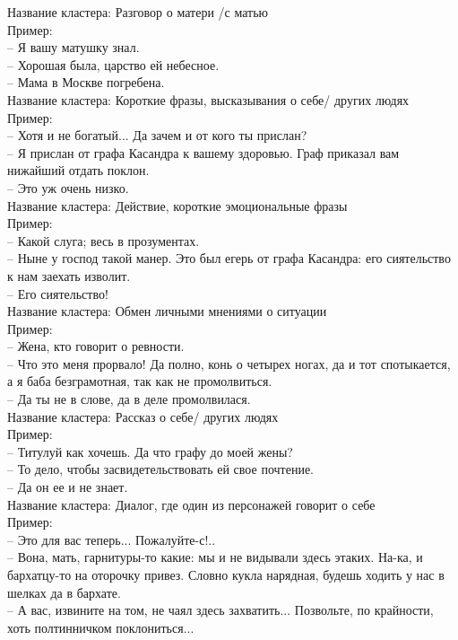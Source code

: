 \documentclass[a4paper,14pt]{article}
\begin{document}
Название кластера: Разговор о матери /с матью\\
Пример: \\
-- Я вашу матушку знал. \\
-- Хорошая была, царство ей небесное. \\
-- Мама в Москве погребена. \\



Название кластера: Короткие фразы, высказывания о себе/ других людях\\
Пример: \\
-- Хотя и не богатый... Да зачем и от кого ты прислан? \\
-- Я прислан от графа Касандра к вашему здоровью. Граф приказал вам нижайший отдать
              поклон. \\
-- Это уж очень низко. \\



Название кластера: Действие, короткие эмоциональные фразы\\
Пример: \\
-- Какой слуга; весь в прозументах. \\
-- Ныне у господ такой манер. Это был егерь от графа Касандра: его сиятельство к нам
              заехать изволит. \\
-- Его сиятельство! \\



Название кластера: Обмен личными мнениями о ситуации\\
Пример: \\
-- Жена, кто говорит о ревности. \\
-- Что это меня прорвало! Да полно, конь о четырех ногах, да и тот спотыкается, а я баба
              безграмотная, так как не промолвиться. \\
-- Да ты не в слове, да в деле промолвилася. \\



Название кластера: Рассказ о себе/ других людях\\
Пример: \\
-- Титулуй как хочешь. Да что графу до моей жены? \\
-- То дело, чтобы засвидетельствовать ей свое почтение. \\
-- Да он ее и не знает. \\



Название кластера: Диалог, где один из персонажей говорит о себе\\
Пример: \\
-- Это для вас теперь... Пожалуйте-с!.. \\
-- Вона, мать, гарнитуры-то какие: мы и не видывали здесь этаких. На-ка, и бархатцу-то
              на оторочку привез. Словно кукла нарядная, будешь ходить у нас в шелках да в
              бархате. \\
-- А вас, извините на том, не чаял здесь захватить... Позвольте, по крайности, хоть
              полтинничком поклониться... \\
\end{document}
